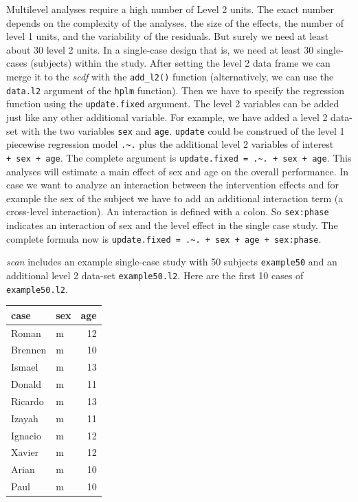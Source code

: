 \documentclass[
  letterpaper,
  DIV=11,
  numbers=noendperiod]{scrreprt}
\begin{document}
Multilevel analyses require a high number of Level 2 units. The exact
number depends on the complexity of the analyses, the size of the
effects, the number of level 1 units, and the variability of the
residuals. But surely we need at least about 30 level 2 units. In a
single-case design that is, we need at least 30 single-cases (subjects)
within the study. After setting the level 2 data frame we can merge it
to the \emph{scdf} with the \texttt{add\_l2()} function (alternatively,
we can use the \texttt{data.l2} argument of the \texttt{hplm} function).
Then we have to specify the regression function using the
\texttt{update.fixed} argument. The level 2 variables can be added just
like any other additional variable. For example, we have added a level 2
data-set with the two variables \texttt{sex} and \texttt{age}.
\texttt{update} could be construed of the level 1 piecewise regression
model \texttt{.\textasciitilde{}.} plus the additional level 2 variables
of interest \texttt{+\ sex\ +\ age}. The complete argument is
\texttt{update.fixed\ =\ .\textasciitilde{}.\ +\ sex\ +\ age}. This
analyses will estimate a main effect of sex and age on the overall
performance. In case we want to analyze an interaction between the
intervention effects and for example the sex of the subject we have to
add an additional interaction term (a cross-level interaction). An
interaction is defined with a colon. So \texttt{sex:phase} indicates an
interaction of sex and the level effect in the single case study. The
complete formula now is
\texttt{update.fixed\ =\ .\textasciitilde{}.\ +\ sex\ +\ age\ +\ sex:phase}.

\emph{scan} includes an example single-case study with 50 subjects
\texttt{example50} and an additional level 2 data-set
\texttt{example50.l2}. Here are the first 10 cases of
\texttt{example50.l2}.

\begin{longtable}[]{@{}llr@{}}
\toprule()
case & sex & age \\
\midrule()
\endhead
Roman & m & 12 \\
Brennen & m & 10 \\
Ismael & m & 13 \\
Donald & m & 11 \\
Ricardo & m & 13 \\
Izayah & m & 11 \\
Ignacio & m & 12 \\
Xavier & m & 12 \\
Arian & m & 10 \\
Paul & m & 10 \\
\bottomrule()
\end{longtable}
\end{document}
